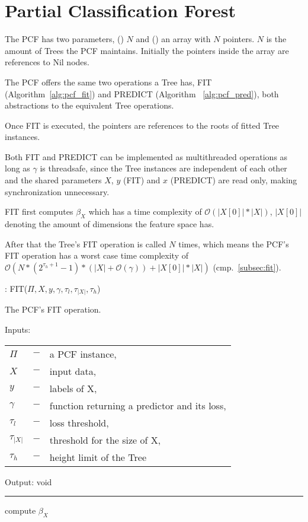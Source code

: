 \section{Partial Classification Forest}
\label{sec:pcf}

The PCF has two parameters, () $N$ and
() an array with $N$ pointers.
$N$ is the amount of Trees the PCF maintains.
Initially the pointers inside the array are references to
Nil nodes.

The PCF offers the same two operations a Tree has, FIT
(Algorithm~\ref{alg:pcf_fit}) and PREDICT (Algorithm~%
\ref{alg:pcf_pred}), both abstractions to the equivalent
Tree operations.

Once FIT is executed, the pointers are references to the
roots of fitted Tree instances.

Both FIT and PREDICT can be implemented as multithreaded
operations as long as $\gamma$ is threadsafe, since the
Tree instances are independent of each other and the shared
parameters $X$, $y$ (FIT) and $x$ (PREDICT) are read only,
making synchronization unnecessary.

FIT first computes $\beta_X$ which has a time complexity of
$\mathcal{O}(|X[0]| * |X|)$, $|X[0]|$ denoting the amount
of dimensions the feature space has.

After that the Tree's FIT operation is called $N$ times,
which means the PCF's FIT operation has a worst case time
complexity of $\mathcal{O} (N * (2^{\tau_h + 1} - 1) *
(|X| + \mathcal{O}(\gamma)) + |X[0]| * |X|)$
(cmp.~\ref{subsec:fit}).

\begin{algorithm}
  \caption{: FIT($\Pi, X, y, \gamma, \tau_{l},
    \tau_{|X|}, \tau_{h}$)}%
  \label{alg:pcf_fit}
  The PCF's FIT operation.

  Inputs:

    \begin{tabu}{llX}
    $\Pi$ &$-$ &a PCF instance,\\
    $X$ &$-$ &input data,\\
    $y$ &$-$ &labels of X,\\
    $\gamma$ &$-$ &function returning a predictor and its
      loss,\\
    $\tau_{l}$ &$-$ &loss threshold,\\
    $\tau_{|X|}$ &$-$ &threshold for the size of X,\\
    $\tau_{h}$ &$-$ &height limit of the Tree
    \end{tabu}

  Output: void

  \noindent\rule{\linewidth}{0.4pt}

  \begin{algorithmic}[1]
    \STATE compute $\beta_X$
    \ENDFOR
  \end{algorithmic}
\end{algorithm}

